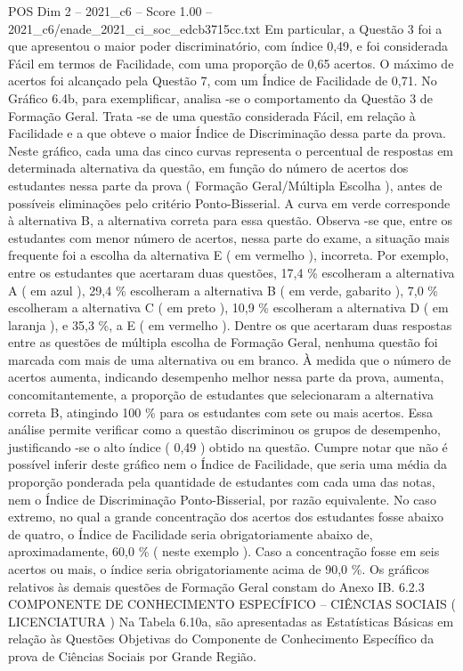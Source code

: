 \begin{textsample}{POS Dim 2 – 2021\_c6 – Score 1.00 – 2021\_c6/enade\_2021\_ci\_soc\_edcb3715cc.txt}
Em particular, a Questão 3 foi a que apresentou o maior poder discriminatório, com índice 0,49, e foi considerada Fácil em termos de Facilidade, com uma proporção de 0,65 acertos.
O máximo de acertos foi alcançado pela Questão 7, com um Índice de Facilidade de 0,71.
No Gráfico 6.4b, para exemplificar, analisa -se o comportamento da Questão 3 de Formação Geral.
Trata -se de uma questão considerada Fácil, em relação à Facilidade e a que obteve o maior Índice de Discriminação dessa parte da prova.
Neste gráfico, cada uma das cinco curvas representa o percentual de respostas em determinada alternativa da questão, em função do número de acertos dos estudantes nessa parte da prova ( Formação Geral/Múltipla Escolha ), antes de possíveis eliminações pelo critério Ponto-Bisserial.
A curva em verde corresponde à alternativa B, a alternativa correta para essa questão.
Observa -se que, entre os estudantes com menor número de acertos, nessa parte do exame, a situação mais frequente foi a escolha da alternativa E ( em vermelho ), incorreta.
Por exemplo, entre os estudantes que acertaram duas questões, 17,4 \% escolheram a alternativa A ( em azul ), 29,4 \% escolheram a alternativa B ( em verde, gabarito ), 7,0 \% escolheram a alternativa C ( em preto ), 10,9 \% escolheram a alternativa D ( em laranja ), e 35,3 \%, a E ( em vermelho ).
Dentre os que acertaram duas respostas entre as questões de múltipla escolha de Formação Geral, nenhuma questão foi marcada com mais de uma alternativa ou em branco.
À medida que o número de acertos aumenta, indicando desempenho melhor nessa parte da prova, aumenta, concomitantemente, a proporção de estudantes que selecionaram a alternativa correta B, atingindo 100 \% para os estudantes com sete ou mais acertos.
Essa análise permite verificar como a questão discriminou os grupos de desempenho, justificando -se o alto índice ( 0,49 ) obtido na questão.
Cumpre notar que não é possível inferir deste gráfico nem o Índice de Facilidade, que seria uma média da proporção ponderada pela quantidade de estudantes com cada uma das notas, nem o Índice de Discriminação Ponto-Bisserial, por razão equivalente.
No caso extremo, no qual a grande concentração dos acertos dos estudantes fosse abaixo de quatro, o Índice de Facilidade seria obrigatoriamente abaixo de, aproximadamente, 60,0 \% ( neste exemplo ).
Caso a concentração fosse em seis acertos ou mais, o índice seria obrigatoriamente acima de 90,0 \%.
Os gráficos relativos às demais questões de Formação Geral constam do Anexo IB. 6.2.3 COMPONENTE DE CONHECIMENTO ESPECÍFICO – CIÊNCIAS SOCIAIS ( LICENCIATURA ) Na Tabela 6.10a, são apresentadas as Estatísticas Básicas em relação às Questões Objetivas do Componente de Conhecimento Específico da prova de Ciências Sociais por Grande Região.

\end{textsample}
